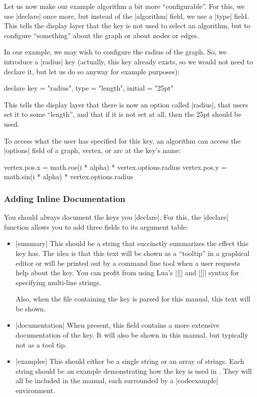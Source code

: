 Let us now make our example algorithm a bit more ``configurable''. For
this, we use |declare| once more, but instead of the |algorithm|
field, we use a |type| field. This tells the display layer that the
key is not used to select an algorithm, but to configure ``something''
about the graph or about nodes or edges.

In our example, we may wish to configure the radius of the graph. So,
we introduce a |radius| key (actually, this key already exists, so we
would not need to declare it, but let us do so anyway for example
purposes):

\begin{codeexample}
declare {
  key = "radius",
  type = "length",
  initial = "25pt"
}
\end{codeexample}

This tells the display layer that there is now an option called
|radius|, that users set it to some ``length'', and that if it is not
set at all, then the 25pt should be used.

To access what the user has specified for this key, an algorithm can
access the |options| field of a graph, vertex, or arc at the
key's name:

\begin{codeexample}
          vertex.pos.x = math.cos(i * alpha) * vertex.options.radius
          vertex.pos.y = math.sin(i * alpha) * vertex.options.radius
\end{codeexample}



\subsubsection{Adding Inline Documentation}

You should always document the keys you |declare|. For this, the
|declare| function allows you to add three fields to its argument
table:
\begin{itemize}
\item |summary| This should be a string that succinctly summarizes the
  effect this key has. The idea is that this text will be shown as a
  ``tooltip'' in a graphical editor or will be printed out by a
  command line tool when a user requests help about the key.
  You can profit from using Lua's |[[| and |]]| syntax for specifying
  multi-line strings.
  
  Also, when the file containing the key is parsed for
  this manual, this text will be shown.
\item |documentation| When present, this field contains a more
  extensive documentation of the key. It will also be shown in this
  manual, but typically not as a tool tip.
\item |examples| This should either be a single string or an array of
  strings. Each string should be an example demonstrating how the key
  is used in \tikzname. They will all be included in the manual, each
  surrounded by a |codeexample| environment.
\end{itemize}

